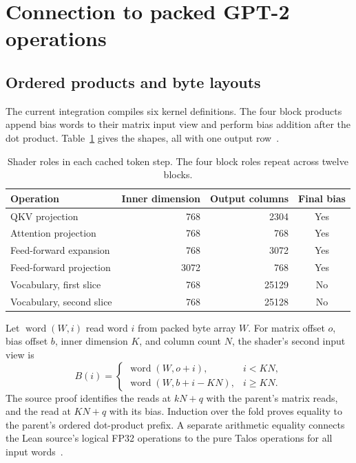 \documentclass[11pt]{article}
\begin{document}
\section{Connection to packed GPT-2 operations}

\subsection{Ordered products and byte layouts}

The current integration compiles six kernel definitions.  The four block products append bias words to their matrix input view and perform bias addition after the dot product.  Table~\ref{tab:kernels} gives the shapes, all with one output row~\cite{packedsource}.

\begin{table}[ht]
\centering
\begin{tabular}{lrrc}
\toprule
Operation & Inner dimension & Output columns & Final bias\\
\midrule
QKV projection & 768 & 2304 & Yes\\
Attention projection & 768 & 768 & Yes\\
Feed-forward expansion & 768 & 3072 & Yes\\
Feed-forward projection & 3072 & 768 & Yes\\
Vocabulary, first slice & 768 & 25129 & No\\
Vocabulary, second slice & 768 & 25128 & No\\
\bottomrule
\end{tabular}
\caption{Shader roles in each cached token step.  The four block roles repeat across twelve blocks.}
\label{tab:kernels}
\end{table}

Let $\operatorname{word}(W,i)$ read word $i$ from packed byte array $W$.  For matrix offset $o$, bias offset $b$, inner dimension $K$, and column count $N$, the shader's second input view is
\[
B(i)=\begin{cases}
\operatorname{word}(W,o+i),&i<KN,\\
\operatorname{word}(W,b+i-KN),&i\geq KN.
\end{cases}
\]
The source proof identifies the reads at $kN+q$ with the parent's matrix reads, and the read at $KN+q$ with its bias.  Induction over the fold proves equality to the parent's ordered dot-product prefix.  A separate arithmetic equality connects the Lean source's logical FP32 operations to the pure Talos operations for all input words~\cite{packedsource}.
\end{document}
